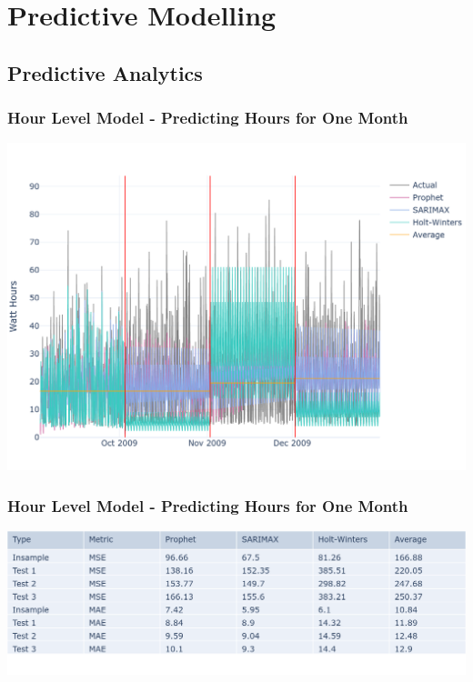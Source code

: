 \documentclass[10pt]{beamer}
\begin{document}
\section{Predictive Modelling}

\subsection{Predictive Analytics}

\begin{frame}
\frametitle{Hour Level Model - Predicting Hours for One Month}

\bigskip
{
    \centering
    \includegraphics[width=\textwidth,height=\textheight,keepaspectratio]{model_comparison_timeseries_hourmodel_hours.png}
    \par
}
\bigskip

\end{frame}

\begin{frame}
\frametitle{Hour Level Model - Predicting Hours for One Month}

\bigskip
{
    \centering
    \includegraphics[width=\textwidth,height=\textheight,keepaspectratio]{model_comparison_table_hourmodel_hours.png}
    \par
}
\bigskip

\end{frame}
\end{document}
